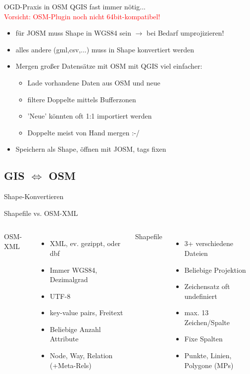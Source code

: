 \documentclass{beamer}
\begin{document}
\begin{frame}{OGD-Praxis in OSM}
	QGIS fast immer nötig... \pause \\
	\hfill \textcolor{red}{Vorsicht: OSM-Plugin noch nicht 64bit-kompatibel!}
\pause
	\begin{itemize}
		\item für JOSM muss Shape in WGS84 sein $\rightarrow$ bei Bedarf umprojizieren!
		\item alles andere (gml,csv,...) muss in Shape konvertiert werden
		\item Mergen großer Datensätze mit OSM mit QGIS viel einfacher:
		\begin{itemize}
			\item Lade vorhandene Daten aus OSM und neue
			\item filtere Doppelte mittels Bufferzonen 
			\item 'Neue' könnten oft 1:1 importiert werden
			\item Doppelte meist von Hand mergen :-/
		\end{itemize}
		\item Speichern als Shape, öffnen mit JOSM, tags fixen
	\end{itemize}
\end{frame}
\subsection{GIS $\iff$ OSM}

\begin{frame}{Shape-Konvertieren}

Shapefile vs. OSM-XML
\vspace{3mm}

 \begin{columns}[c]
	OSM-XML
		\begin{itemize}
			\item XML, ev. gezippt, oder dbf
			\item Immer WGS84, Dezimalgrad
			\item UTF-8
			\item key-value pairs, Freitext
			\item Beliebige Anzahl Attribute
			\item Node, Way, Relation (+Meta-Rels)
		\end{itemize}
	Shapefile
		\begin{itemize}
			\item 3+ verschiedene Dateien
			\item Beliebige Projektion
			\item Zeichensatz oft undefiniert
			\item max. 13 Zeichen/Spalte
			\item Fixe Spalten
			\item Punkte, Linien, Polygone (MPs)
		\end{itemize}
\end{columns}

\end{frame}
\end{document}
